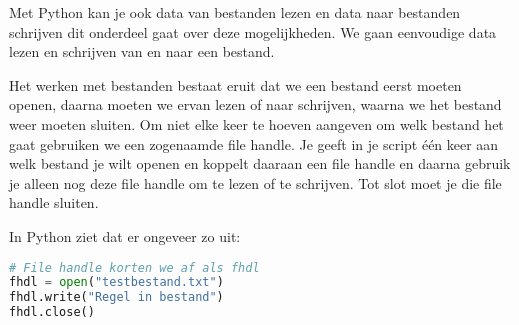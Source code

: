 Met Python kan je ook data van bestanden lezen en data naar bestanden schrijven dit onderdeel gaat over deze mogelijkheden. We gaan eenvoudige data lezen en schrijven van en naar een bestand.

Het werken met bestanden bestaat eruit dat we een bestand eerst moeten openen, daarna moeten we ervan lezen of naar schrijven, waarna we het bestand weer moeten sluiten. Om niet elke keer te hoeven aangeven om welk bestand het gaat gebruiken we een zogenaamde file handle. Je geeft in je script \'e\'en keer aan welk bestand je wilt openen en koppelt daaraan een file handle en daarna gebruik je alleen nog deze file handle om te lezen of te schrijven. Tot slot moet je die file handle sluiten.

In Python ziet dat er ongeveer zo uit:
\begin{lstlisting}[language=python]
# File handle korten we af als fhdl
fhdl = open("testbestand.txt")
fhdl.write("Regel in bestand")
fhdl.close()
\end{lstlisting}
